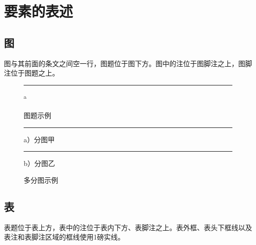 \chapter{要素的表述}
\section{图}
图与其前面的条文之间空一行，图题位于图下方。图中的注位于图脚注之上，图脚注位于图题之上。

\begin{figure}[htb]
    \centering
    \rule{4cm}{3cm}\textsuperscript{a}
    \caption{图题示例}
    \label{fig:example}
\end{figure}

\begin{figure}[htb]
    \centering
    \begin{minipage}{0.45\linewidth}
        \centering
        \rule{25mm}{20mm}\par
        {\heiti a）分图甲}
    \end{minipage}
    \begin{minipage}{0.45\linewidth}
        \centering
        \rule{25mm}{20mm}\par
        {\heiti b）分图乙}
    \end{minipage}
    \caption{多分图示例}
    \label{fig:subfigures}
\end{figure}

\section{表}
表题位于表上方，表中的注位于表内下方、表脚注之上。表外框、表头下框线以及表注和表脚注区域的框线使用1磅实线。

